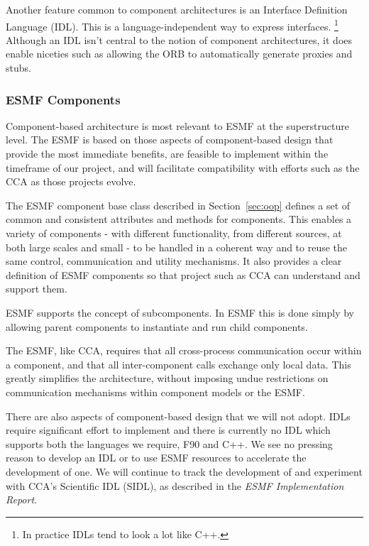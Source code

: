 Another feature common to component architectures is an Interface Definition 
Language (IDL).  This is a language-independent way to express 
interfaces.  \footnote{In practice IDLs tend to look a lot like C++.}  
Although 
an IDL isn't central to the notion of component architectures, it does enable 
niceties such as allowing the ORB to automatically generate proxies and stubs.

\subsubsection{ESMF Components}

Component-based architecture is most relevant to ESMF at the superstructure level. 
The ESMF is based on those aspects of component-based design that
provide the most immediate benefits, are feasible to implement within the
timeframe of our project, and will facilitate compatibility with efforts
such as the CCA as those projects evolve.  

The ESMF component base class described in Section~\ref{sec:oop} defines a set 
of common and consistent attributes
and methods for components.  This enables a variety of components - with different functionality, from different sources, at both large scales and small - to be handled
in a coherent way and to reuse the same control, communication and utility
mechanisms.  It also provides a clear definition of ESMF components so that
project such as CCA can understand and support them.  

ESMF supports the concept of subcomponents.  In ESMF this is done simply
by allowing parent components to instantiate and run child components.

The ESMF, like CCA, requires that all cross-process communication occur
within a component, and that all inter-component calls exchange only
local data.  This greatly simplifies the architecture, without 
imposing undue restrictions on communication mechanisms within component
models or the ESMF.

There are also aspects of component-based design that we will not adopt.
IDLs require significant effort to implement and there is currently no
IDL which supports both the languages we require, F90 and C++.  We see 
no pressing
reason to develop an IDL or to use ESMF resources to accelerate the development
of one.  We will continue to track the 
development of and experiment with CCA's Scientific IDL (SIDL), 
as described in the {\it ESMF Implementation Report}.

